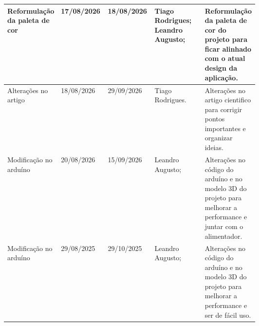 \documentclass[
landscape,
  a4paper,
  12pt,
  english,
  brazilian,
]{article}
\begin{document}
 \begin{table}[]
\centering


\begin{tabular}{|>{\raggedright\arraybackslash}p{0.2\linewidth}|l|l|>{\raggedright\arraybackslash}p{0.2\linewidth}|>{\raggedright\arraybackslash}p{0.2\linewidth}|}

\hline
 Reformulação da paleta de cor&                            17/08/2026&                18/08/2026&                 Tiago Rodrigues; Leandro Augusto;&                                 Reformulação da paleta de cor do projeto para ficar alinhado com o atual design da aplicação.\\ \hline
                  Alterações no artigo&                            18/08/2026&               29/09/2026&                 Tiago Rodrigues.&                                  Alterações no artigo cientifico para corrigir pontos importantes e organizar ideias.\\ \hline
 
                  Modificação no arduíno&                            20/08/2026&                15/09/2026&                  Leandro Augusto;&                                 Alterações no código do arduíno e no modelo 3D do projeto para melhorar a performance e juntar com o alimentador.\\ \hline
                  Modificação no arduíno&                            29/08/2025&                29/10/2025&                  Leandro Augusto;&                                 Alterações no código do arduíno e no modelo 3D do projeto para melhorar a performance e ser de fácil uso.\\ \hline
 
\end{tabular}


\end{table}
\end{document}
